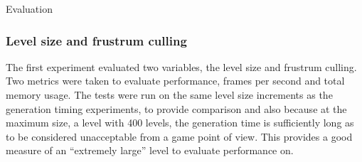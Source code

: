 \documentclass[final]{cmpreport}
\begin{document}
\begin{section}{Evaluation}
\subsubsection{Level size and frustrum culling}
The first experiment evaluated two variables, the level size and frustrum culling. Two metrics were taken to evaluate performance, frames per second and total memory usage. The tests were run on the same level size increments as the generation timing experiments, to provide comparison and also because at the maximum size, a level with 400 levels, the generation time is sufficiently long as to be considered unacceptable from a game point of view. This provides a good measure of an ``extremely large'' level to evaluate performance on.

\begin{table}[]
    \centering
    \caption{Timing results from runtime performance tests varying the level size and frustrum culling}
    \label{tab:genres3}
    \end{table}


\end{section}
\end{document}
